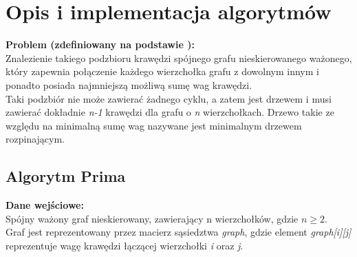 \chapter [Sprawozdzanie 2]{Opis i implementacja algorytmów} 
\fancyhead[L]{}
\fancyhead[R]{}
\textbf{Problem (zdefiniowany na podstawie \cite{prim2}):}\\
Znalezienie takiego podzbioru krawędzi spójnego grafu nieskierowanego ważonego, który zapewnia połączenie każdego wierzchołka grafu z dowolnym innym i ponadto posiada najmniejszą możliwą sumę wag krawędzi. \\Taki podzbiór nie może zawierać żadnego cyklu, a zatem jest drzewem i musi zawierać dokładnie \emph{n-1} krawędzi dla grafu o \emph{n} wierzchołkach. Drzewo takie ze względu na minimalną sumę wag nazywane jest minimalnym drzewem rozpinającym.

\section{Algorytm Prima}
\textbf{Dane wejściowe:} \\ 
Spójny ważony graf nieskierowany, zawierający n wierzchołków, gdzie $n \geqslant 2$.\\
Graf jest reprezentowany przez macierz sąsiedztwa \emph{graph}, gdzie element \emph{graph[i][j]} reprezentuje wagę krawędzi łączącej wierzchołki \emph{i} oraz \emph{j}.\\

